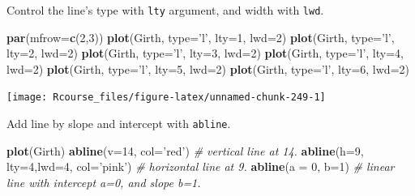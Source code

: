 \documentclass[]{book}
\newenvironment{Shaded}{\begin{snugshade}}{\end{snugshade}}
\newcommand{\CommentTok}[1]{\textcolor[rgb]{0.56,0.35,0.01}{\textit{#1}}}
\newcommand{\DataTypeTok}[1]{\textcolor[rgb]{0.13,0.29,0.53}{#1}}
\newcommand{\DecValTok}[1]{\textcolor[rgb]{0.00,0.00,0.81}{#1}}
\newcommand{\KeywordTok}[1]{\textcolor[rgb]{0.13,0.29,0.53}{\textbf{#1}}}
\newcommand{\NormalTok}[1]{#1}
\newcommand{\StringTok}[1]{\textcolor[rgb]{0.31,0.60,0.02}{#1}}
\theoremstyle{definition}
\theoremstyle{definition}
\theoremstyle{definition}
\theoremstyle{remark}
\begin{document}
Control the line's type with \texttt{lty} argument, and width with \texttt{lwd}.

\begin{Shaded}
\begin{Highlighting}[]
\KeywordTok{par}\NormalTok{(}\DataTypeTok{mfrow=}\KeywordTok{c}\NormalTok{(}\DecValTok{2}\NormalTok{,}\DecValTok{3}\NormalTok{))}
\KeywordTok{plot}\NormalTok{(Girth, }\DataTypeTok{type=}\StringTok{'l'}\NormalTok{, }\DataTypeTok{lty=}\DecValTok{1}\NormalTok{, }\DataTypeTok{lwd=}\DecValTok{2}\NormalTok{)}
\KeywordTok{plot}\NormalTok{(Girth, }\DataTypeTok{type=}\StringTok{'l'}\NormalTok{, }\DataTypeTok{lty=}\DecValTok{2}\NormalTok{, }\DataTypeTok{lwd=}\DecValTok{2}\NormalTok{)}
\KeywordTok{plot}\NormalTok{(Girth, }\DataTypeTok{type=}\StringTok{'l'}\NormalTok{, }\DataTypeTok{lty=}\DecValTok{3}\NormalTok{, }\DataTypeTok{lwd=}\DecValTok{2}\NormalTok{)}
\KeywordTok{plot}\NormalTok{(Girth, }\DataTypeTok{type=}\StringTok{'l'}\NormalTok{, }\DataTypeTok{lty=}\DecValTok{4}\NormalTok{, }\DataTypeTok{lwd=}\DecValTok{2}\NormalTok{)}
\KeywordTok{plot}\NormalTok{(Girth, }\DataTypeTok{type=}\StringTok{'l'}\NormalTok{, }\DataTypeTok{lty=}\DecValTok{5}\NormalTok{, }\DataTypeTok{lwd=}\DecValTok{2}\NormalTok{)}
\KeywordTok{plot}\NormalTok{(Girth, }\DataTypeTok{type=}\StringTok{'l'}\NormalTok{, }\DataTypeTok{lty=}\DecValTok{6}\NormalTok{, }\DataTypeTok{lwd=}\DecValTok{2}\NormalTok{)}
\end{Highlighting}
\end{Shaded}

\texttt{[image: Rcourse\_files/figure-latex/unnamed-chunk-249-1]}

Add line by slope and intercept with \texttt{abline}.

\begin{Shaded}
\begin{Highlighting}[]
\KeywordTok{plot}\NormalTok{(Girth)}
\KeywordTok{abline}\NormalTok{(}\DataTypeTok{v=}\DecValTok{14}\NormalTok{, }\DataTypeTok{col=}\StringTok{'red'}\NormalTok{) }\CommentTok{# vertical line at 14.}
\KeywordTok{abline}\NormalTok{(}\DataTypeTok{h=}\DecValTok{9}\NormalTok{, }\DataTypeTok{lty=}\DecValTok{4}\NormalTok{,}\DataTypeTok{lwd=}\DecValTok{4}\NormalTok{, }\DataTypeTok{col=}\StringTok{'pink'}\NormalTok{) }\CommentTok{# horizontal line at 9.}
\KeywordTok{abline}\NormalTok{(}\DataTypeTok{a =} \DecValTok{0}\NormalTok{, }\DataTypeTok{b=}\DecValTok{1}\NormalTok{) }\CommentTok{# linear line with intercept a=0, and slope b=1.}
\end{Highlighting}
\end{Shaded}
\end{document}

